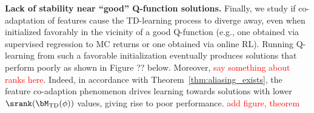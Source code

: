 
\textbf{Lack of stability near ``good'' Q-function solutions.}
Finally, we study if co-adaptation of features cause the TD-learning process to diverge away, even when initialized favorably in the vicinity of a good Q-function (e.g., one obtained via supervised regression to MC returns or one obtained via online RL). Running Q-learning from such a favorable initialization eventually produces solutions that perform poorly as shown in Figure ?? below. Moreover, \textcolor{red}{say something about ranks here}. Indeed, in accordance with Theorem~\ref{thm:aliasing_exists}, the feature co-adaption phenomenon drives learning towards solutions with lower $\srank(\bM_{\mathrm{TD}}(\phi))$ values, giving rise to poor performance. \textcolor{red}{add figure, theorem}      



